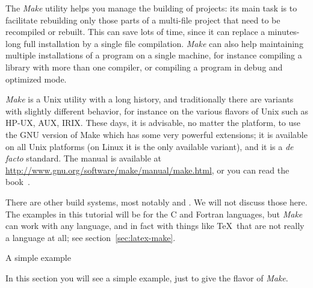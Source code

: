 

The \emph{Make} utility helps you manage the building of
projects: its main task is to facilitate rebuilding only those parts 
of a multi-file project that need to be recompiled or rebuilt.
This can save lots of time, since it
can replace a minutes-long full installation by a single file
compilation. \emph{Make} can also help maintaining multiple
installations of a program on a single machine, for instance compiling
a library with more than one compiler, or compiling a program in debug
and optimized mode.

\emph{Make} is a Unix utility with a long history, and traditionally
there are variants with slightly different behavior, 
for instance on the various
flavors of Unix such as HP-UX, AUX, IRIX. 
These days, it is advisable, no
matter the platform, to use the GNU version of Make which has some
very powerful extensions; it is available on all Unix platforms
(on Linux it is the only available variant), and it is a {\it de
  facto} standard. The manual is available at
\url{http://www.gnu.org/software/make/manual/make.html}, or you can
read the book~\cite{OReilly-GnuMake}.

There are other build systems, most notably  and
. We will not discuss those here. The examples in this
tutorial will be for the C and Fortran languages, but \emph{Make} can
work with any language, and in fact with things like \TeX\ that are
not really a language at all; see section~\ref{sec:latex-make}.

 {A simple example}

\begin{purpose}
In this section you will see a simple example, just to give the flavor of
\emph{Make}.
\end{purpose}

